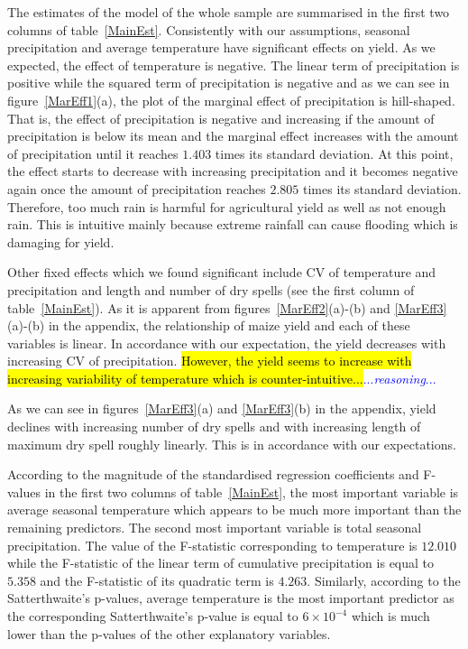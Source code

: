 \documentclass[12pt]{iopart}
\begin{document}
\vspace{1cm}


The estimates of the model of the whole sample are summarised in the first two columns of table~\ref{MainEst}. Consistently with our assumptions, seasonal precipitation and average temperature have significant effects on yield. As we expected, the effect of temperature is negative. The linear term of precipitation is positive while the squared term of precipitation is negative and as we can see in figure~\ref{MarEff1}(a), the plot of the marginal effect of precipitation is hill-shaped. That is, the effect of precipitation is negative and increasing if the amount of precipitation is below its mean and the marginal effect increases with the amount of precipitation until it reaches $1.403$ times its standard deviation. At this point, the effect starts to decrease with increasing precipitation and it becomes negative again once the amount of precipitation reaches $2.805$ times its standard deviation. Therefore, too  much rain is harmful for agricultural yield as well as not enough rain. This is intuitive mainly because extreme rainfall can cause flooding which is damaging for yield.



Other fixed effects which we found significant include CV of temperature and precipitation and length and number of dry spells (see the first column of table~\ref{MainEst}). As it is apparent from figures~\ref{MarEff2}(a)-(b) and \ref{MarEff3}(a)-(b) in the appendix, the relationship of maize yield and each of these variables is linear. In accordance with our expectation, the yield decreases with increasing CV of precipitation. \hl{However, the yield seems to increase with increasing variability of temperature which is counter-intuitive...}\textcolor{blue}{...\textit{reasoning}...}


As we can see in figures~\ref{MarEff3}(a) and \ref{MarEff3}(b) in the appendix, yield declines with increasing number of dry spells and with increasing length of maximum dry spell roughly linearly. This is in accordance with our expectations.

According to the magnitude of the standardised regression coefficients and F-values in the first two columns of table~\ref{MainEst}, the most important variable is average seasonal temperature which appears to be much more important than the remaining predictors. The second most important variable is total seasonal precipitation. The value of the F-statistic corresponding to temperature is $12.010$ while the F-statistic of the linear term of cumulative precipitation is equal to $5.358$ and the F-statistic of its quadratic term is $4.263$. Similarly, according to the Satterthwaite's p-values, average temperature is the most important predictor as the corresponding Satterthwaite's p-value is equal to $6\times10^{-4}$ which is much lower than the p-values of the other explanatory variables.
\end{document}
